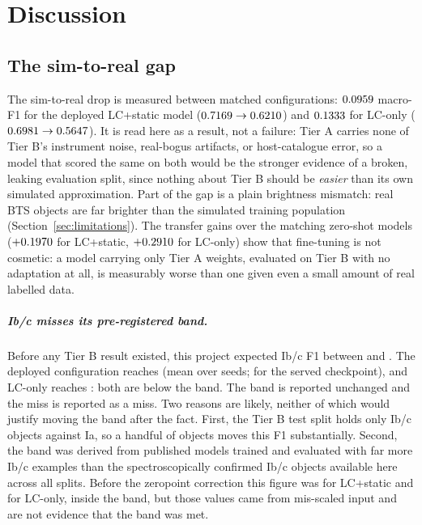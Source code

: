 \chapter{Discussion}
\label{sec:discussion}

\section{The sim-to-real gap}

The sim-to-real drop is measured between matched configurations:
$0.0959{}$ macro-F1 for the deployed LC+static model
($0.7169{} \to 0.6210{}$) and
$0.1333{}$ for LC-only
($0.6981{} \to 0.5647{}$). It is read here as a
result, not a failure: Tier A carries none of Tier B's instrument noise,
real-bogus artifacts, or host-catalogue error, so a model that scored the
same on both would be the stronger evidence of a broken, leaking evaluation
split, since nothing about Tier B should be \emph{easier} than its own
simulated approximation. Part of the gap is a plain brightness mismatch:
real BTS objects are far brighter than the simulated training population
(Section~\ref{sec:limitations}). The transfer gains over the matching
zero-shot models ($+0.1970{}$ for LC+static, $+0.2910{}$
for LC-only) show that fine-tuning is not cosmetic: a model carrying only
Tier A weights, evaluated on Tier B with no adaptation at all, is
measurably worse than one given even a small amount of real labelled data.

\paragraph{Ib/c misses its pre-registered band.} Before any Tier B result
existed, this project expected Ib/c F1 between \IbcBandLow{} and
\IbcBandHigh{}. The deployed configuration reaches \WithStaticFIbc{} (mean
over seeds; \DeployedFIbc{} for the served checkpoint), and LC-only reaches
\LCOnlyFIbc{}: both are below the band. The band is reported unchanged and
the miss is reported as a miss. Two reasons are likely, neither of which
would justify moving the band after the fact. First, the Tier B test split
holds only \TierBSupportIbc{} Ib/c objects against \TierBSupportIa{} Ia, so a
handful of objects moves this F1 substantially. Second, the band was
derived from published models trained and evaluated with far more Ib/c
examples than the \TierBJoinCountIbc{} spectroscopically confirmed Ib/c
objects available here across all splits. Before the zeropoint correction
this figure was \PreFixWithStaticFIbc{} for LC+static and
\PreFixLCOnlyFIbc{} for LC-only, inside the band, but those values came from
mis-scaled input and are not evidence that the band was met.

